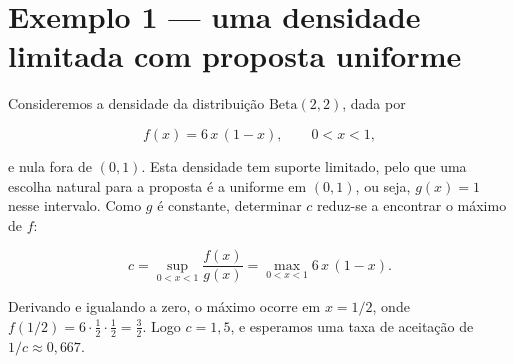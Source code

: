 \documentclass[
  portuguese,
  11pt,
  openany]{book}
\newenvironment{Shaded}{\begin{snugshade}}{\end{snugshade}}
\newcommand{\AttributeTok}[1]{\textcolor[rgb]{0.13,0.29,0.53}{#1}}
\newcommand{\CommentTok}[1]{\textcolor[rgb]{0.56,0.35,0.01}{\textit{#1}}}
\newcommand{\ControlFlowTok}[1]{\textcolor[rgb]{0.13,0.29,0.53}{\textbf{#1}}}
\newcommand{\DecValTok}[1]{\textcolor[rgb]{0.00,0.00,0.81}{#1}}
\newcommand{\DocumentationTok}[1]{\textcolor[rgb]{0.56,0.35,0.01}{\textbf{\textit{#1}}}}
\newcommand{\FloatTok}[1]{\textcolor[rgb]{0.00,0.00,0.81}{#1}}
\newcommand{\FunctionTok}[1]{\textcolor[rgb]{0.13,0.29,0.53}{\textbf{#1}}}
\newcommand{\NormalTok}[1]{#1}
\newcommand{\OtherTok}[1]{\textcolor[rgb]{0.56,0.35,0.01}{#1}}
\newcommand{\SpecialCharTok}[1]{\textcolor[rgb]{0.81,0.36,0.00}{\textbf{#1}}}
\begin{document}
\section{Exemplo 1 --- uma densidade limitada com proposta uniforme}\label{exemplo-1-uma-densidade-limitada-com-proposta-uniforme}

Consideremos a densidade da distribuição \(\text{Beta}(2,2)\), dada por

\[
f(x) = 6\,x\,(1-x), \qquad 0 < x < 1,
\]

e nula fora de \((0,1)\). Esta densidade tem suporte limitado, pelo que uma
escolha natural para a proposta é a uniforme em \((0,1)\), ou seja, \(g(x) = 1\)
nesse intervalo. Como \(g\) é constante, determinar \(c\) reduz-se a encontrar o
máximo de \(f\):

\[
c = \sup_{0<x<1} \frac{f(x)}{g(x)} = \max_{0<x<1} 6\,x\,(1-x).
\]

Derivando e igualando a zero, o máximo ocorre em \(x = 1/2\), onde
\(f(1/2) = 6 \cdot \tfrac{1}{2} \cdot \tfrac{1}{2} = \tfrac{3}{2}\). Logo
\(c = 1{,}5\), e esperamos uma taxa de aceitação de \(1/c \approx 0{,}667\).

\begin{Shaded}
\end{Shaded}
\end{document}
